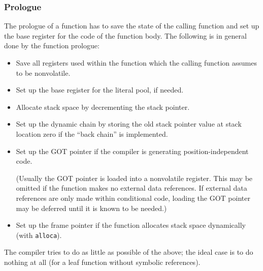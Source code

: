 \documentclass[USenglish,fontsize=11pt,twoside,%
  toc=bib,toc=idx,toc=graduated,numbers=noendperiod,
  bookmarks=true,
  bookmarksnumbered=true,
  bookmarksopen=true,
  bookmarksopenlevel=1,
  breaklinks=true,
  colorlinks=true,
  linkcolor=black,
  pdfpagelayout={TwoPageRight},
  pdfusetitle=true
]{scrreprt}
\begin{document}
\subsubsection{Prologue}
The prologue of a function has to save the state of the calling
function and set up the base register for the code of the function
body.  The following is in general done by the function
prologue:
\begin{itemize}
\item Save all registers used within the function which the calling
  function assumes to be nonvolatile.
\item Set up the base register for the literal pool, if needed.
\item Allocate stack space by decrementing the stack pointer.
\item Set up the dynamic chain by storing the old stack pointer value
  at stack location zero if the ``back chain'' is implemented.
\item Set up the GOT pointer if the compiler is generating
  position-independent code.

  (Usually the GOT pointer is loaded into a nonvolatile register.  This
  may be omitted if the function makes no external data references.  If
  external data references are only made within conditional code, loading
  the GOT pointer may be deferred until it is known to be needed.)
\item Set up the frame pointer if the function allocates stack space
  dynamically (with \texttt{alloca}).
\end{itemize}

The compiler tries to do as little as possible of the above; the ideal
case is to do nothing at all (for a leaf function without symbolic
references).
\end{document}

